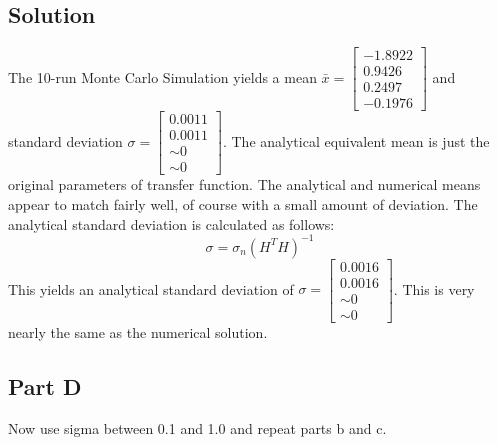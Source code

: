 \documentclass{article}
\begin{document}
\subsection*{Solution}
The 10-run Monte Carlo Simulation yields a mean $\bar{x} = \begin{bmatrix} -1.8922 \\ 0.9426 \\ 0.2497 \\ -0.1976 \end{bmatrix}$ and standard deviation 
$\sigma = \begin{bmatrix} 0.0011 \\ 0.0011 \\ \sim 0 \\ \sim 0 \end{bmatrix}$.  The analytical equivalent mean is just the original parameters of transfer 
function.  The analytical and numerical means appear to match fairly well, of course with a small amount of deviation.  The analytical standard deviation 
is calculated as follows:
\begin{equation}
    \sigma = \sigma_n (H^T H)^{-1}
\end{equation}
This yields an analytical standard deviation of $\sigma = \begin{bmatrix} 0.0016 \\ 0.0016 \\ \sim 0 \\ \sim 0 \end{bmatrix}$.  This is very nearly the same 
as the numerical solution.

\subsection*{Part D}
Now use sigma between 0.1 and 1.0 and repeat parts b and c.
\end{document}
